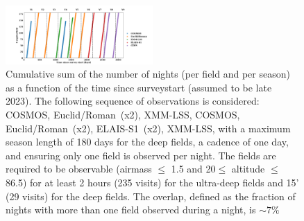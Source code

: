 \documentclass[skiphelvet,twocolumn]{aastex63}
\newcommand{\cosmos}{{COSMOS}}
\newcommand{\elais}{{ELAIS-S1}}
\newcommand{\xmm}{{XMM-LSS}}
\newcommand{\adfs}{{Euclid/Roman}}
\begin{document}
\begin{figure}[htbp]
\begin{center}
  \includegraphics[width=0.5\textwidth,height=0.3\textwidth]{timely_sequence_235visits.png}
  \caption{ Cumulative sum of the number of nights (per field and per season) as a function of the time since surveystart (assumed to be late 2023).  The following sequence of observations is considered: \cosmos, \adfs~(x2), \xmm, \cosmos, \adfs~(x2), \elais~(x2), \xmm ,  with  a  maximum  season  length  of  180  days for the deep fields,  a  cadence  of  one day, and ensuring only one field is observed per night.  The fields are required to be observable (airmass $\leq$ 1.5 and 20\textdegree $\leq$ altitude $\leq$ 86.5\textdegree) for at least 2 hours (235 visits) for the ultra-deep fields and 15' (29 visits) for the deep fields.  The overlap, defined as the fraction of nights with more than one field observed during a night, is $\sim7\%$}\label{fig:timelysequence}
\end{center}
\end{figure}
\end{document}
